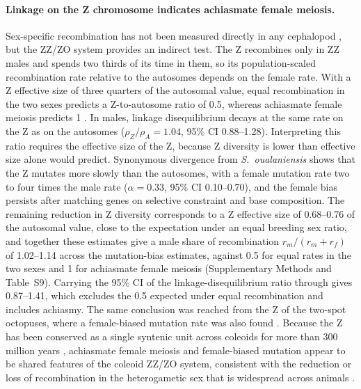 \documentclass[11pt]{article}
\begin{document}
\paragraph{Linkage on the Z chromosome indicates achiasmate female meiosis.}
Sex-specific recombination has not been measured directly in any cephalopod \citep{coffing2026}, but the ZZ/ZO system \citep{coffing2025,small2026} provides an indirect test. The Z recombines only in ZZ males and spends two thirds of its time in them, so its population-scaled recombination rate relative to the autosomes depends on the female rate. With a Z effective size of three quarters of the autosomal value, equal recombination in the two sexes predicts a Z-to-autosome ratio of 0.5, whereas achiasmate female meiosis predicts 1 \citep{coffing2026}. In males, linkage disequilibrium decays at the same rate on the Z as on the autosomes ($\rho_Z/\rho_A=1.04$, 95\% CI 0.88--1.28). Interpreting this ratio requires the effective size of the Z, because Z diversity is lower than effective size alone would predict. Synonymous divergence from \textit{S.~oualaniensis} shows that the Z mutates more slowly than the autosomes, with a female mutation rate two to four times the male rate ($\alpha=0.33$, 95\% CI 0.10--0.70), and the female bias persists after matching genes on selective constraint and base composition. The remaining reduction in Z diversity corresponds to a Z effective size of 0.68--0.76 of the autosomal value, close to the expectation under an equal breeding sex ratio, and together these estimates give a male share of recombination $r_m/(r_m+r_f)$ of 1.02--1.14 across the mutation-bias estimates, against 0.5 for equal rates in the two sexes and 1 for achiasmate female meiosis (Supplementary Methods and Table~S9). Carrying the 95\% CI of the linkage-disequilibrium ratio through gives 0.87--1.41, which excludes the 0.5 expected under equal recombination and includes achiasmy. The same conclusion was reached from the Z of the two-spot octopuses, where a female-biased mutation rate was also found \citep{coffing2025,coffing2026}. Because the Z has been conserved as a single syntenic unit across coleoids for more than 300 million years \citep{coffing2025,small2026}, achiasmate female meiosis and female-biased mutation appear to be shared features of the coleoid ZZ/ZO system, consistent with the reduction or loss of recombination in the heterogametic sex that is widespread across animals \citep{burt1991,lenormand2005}.

\end{document}
